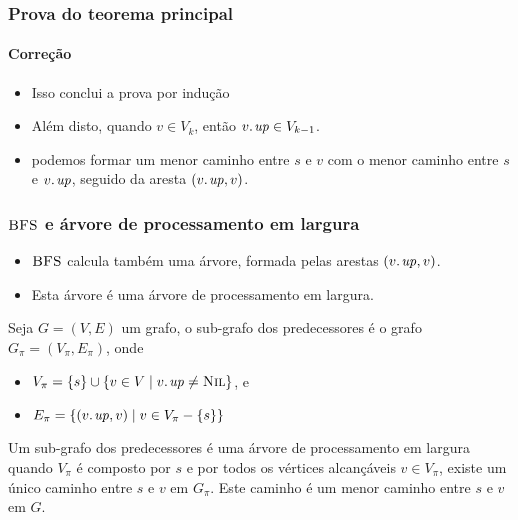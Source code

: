 \documentclass{beamer}
\begin{document}
\begin{frame}
\frametitle{Prova do teorema principal}
\framesubtitle{Correção}

\begin{itemize}
\item Isso conclui a prova por indução
\item Além disto, quando $v \in V_k$, então $\attrib{v}{up} \in V_{k-1}$.
\item podemos formar um menor caminho entre $s$ e $v$ com o menor
caminho entre $s$ e $\attrib{v}{up}$, seguido da aresta $(\attrib{v}{up}, v)$.
\end{itemize}

\end{frame}

\begin{frame}
\frametitle{$\textnormal{\scshape BFS}$ e árvore de processamento em largura}

\begin{itemize}
\item $\textnormal{\scshape BFS}$ calcula também uma árvore, formada pelas arestas
$(\attrib{v}{up}, v)$.
\item Esta árvore é uma árvore de processamento em largura.
\end{itemize}
\begin{definition}
Seja $G=(V, E)$ um grafo, o sub-grafo dos predecessores é o
grafo $G_\pi = (V_\pi, E_\pi)$, onde
\begin{itemize}
\item $V_\pi = \{s\} \cup \{ v \in V \mid \attrib{v}{up} \neq \const{Nil} \}$, e
\item $E_\pi = \{ (\attrib{v}{up}, v) \mid v \in V_\pi - \{ s \} \}$
\end{itemize}
\end{definition}

\begin{definition}
Um sub-grafo dos predecessores é uma árvore de processamento em largura
quando $V_\pi$ é composto por $s$ e por todos os vértices alcançáveis
$v \in V_\pi$, existe um único caminho entre $s$ e $v$ em $G_\pi$. Este
caminho é um menor caminho entre $s$ e $v$ em $G$.
\end{definition}

\end{frame}
\end{document}
